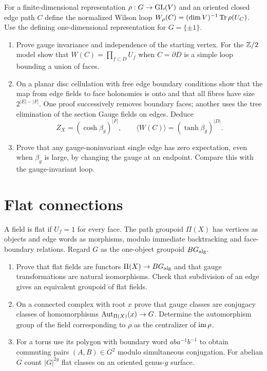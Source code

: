 \begin{exercise}
For a finite-dimensional representation $\rho:G\to\operatorname{GL}(V)$ and
an oriented closed edge path $C$ define the normalized Wilson loop
$W_\rho(C)=(\dim V)^{-1}\operatorname{Tr}\rho(U_C)$.
Use the defining one-dimensional representation for $G=\{\pm1\}$.
\begin{enumerate}[label=(\alph*)]
\item Prove gauge invariance and independence of the starting
vertex. For the $\mathbb Z/2$ model show that
$W(C)=\prod_{f\subset D}U_f$ when $C=\partial D$ is a simple
loop bounding a union of faces.
\item On a planar disc cellulation with free edge boundary
conditions show that the map from edge fields to face holonomies
is onto and that all fibres have size $2^{|E|-|F|}$.
One proof successively removes boundary faces; another uses
the tree elimination of the section Gauge fields on edges.
Deduce
\[
 Z_X=(\cosh\beta_g)^{|F|},\qquad
 \langle W(C)\rangle=(\tanh\beta_g)^{|D|}.
\]
\item Prove that any gauge-noninvariant single edge has zero
expectation, even when $\beta_g$ is large, by changing the gauge
at an endpoint. Compare this with the gauge-invariant loop.
\end{enumerate}
\end{exercise}

\section{Flat connections}

\begin{exercise}
A field is flat if $U_f=1$ for every face. The path groupoid
$\Pi(X)$ has vertices as objects and edge words as morphisms,
modulo immediate backtracking and face-boundary relations.
Regard $G$ as the one-object groupoid $BG_{\rm alg}$.
\begin{enumerate}[label=(\alph*)]
\item Prove that flat fields are functors
$\Pi(X)\to BG_{\rm alg}$ and that gauge transformations are
natural isomorphisms. Check that subdivision of an edge gives
an equivalent groupoid of flat fields.
\item On a connected complex with root $x$ prove that gauge
classes are conjugacy classes of homomorphisms
$\operatorname{Aut}_{\Pi(X)}(x)\to G$. Determine the automorphism group
of the field corresponding to $\rho$ as the centralizer
of $\operatorname{im}\rho$.
\item For a torus use its polygon with boundary word
$aba^{-1}b^{-1}$ to obtain commuting pairs $(A,B)\in G^2$
modulo simultaneous conjugation. For abelian $G$ count
$|G|^{2g}$ flat classes on an oriented genus-$g$ surface.
\end{enumerate}
\end{exercise}

